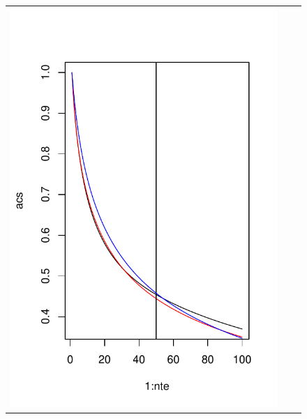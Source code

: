 \documentclass[12pt]{article}
\begin{document}
\begin{figure}
\begin{center}
\begin{tabular}{ccc}
\includegraphics[scale=0.4]{../info_theory_sims/fig_sim5b.pdf} &

\end{tabular}
\end{center}
\end{figure}
\end{document}
